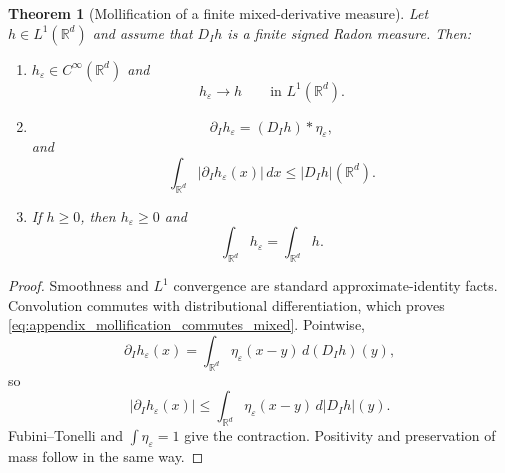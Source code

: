 \documentclass[11pt,letterpaper]{article}
\newtheorem{theorem}{Theorem}[section]
\theoremstyle{definition}
\theoremstyle{remark}
\begin{document}
\begin{theorem}[Mollification of a finite mixed-derivative measure]
\label{thm:appendix_mollification_mixed_measure}
Let $h\in L^1(\mathbb R^d)$ and assume that $D_Ih$ is a finite signed Radon
measure. Then:

\begin{enumerate}
\item[\emph{(i)}]
$h_\varepsilon\in C^\infty(\mathbb R^d)$ and
$$
h_\varepsilon\to h
\qquad
\text{in }L^1(\mathbb R^d).
$$

\item[\emph{(ii)}]
\begin{equation}
\label{eq:appendix_mollification_commutes_mixed}
\partial_Ih_\varepsilon=(D_Ih)*\eta_\varepsilon,
\end{equation}
and
\begin{equation}
\label{eq:appendix_mollification_mixed_contraction}
\int_{\mathbb R^d}|\partial_Ih_\varepsilon(x)|\,dx
\le
|D_Ih|(\mathbb R^d).
\end{equation}

\item[\emph{(iii)}] If $h\ge0$, then $h_\varepsilon\ge0$ and
$$
\int_{\mathbb R^d}h_\varepsilon
=
\int_{\mathbb R^d}h.
$$
\end{enumerate}
\end{theorem}

\begin{proof}
Smoothness and $L^1$ convergence are standard approximate-identity facts.
Convolution commutes with distributional differentiation, which proves
\eqref{eq:appendix_mollification_commutes_mixed}. Pointwise,
$$
\partial_Ih_\varepsilon(x)
=
\int_{\mathbb R^d}\eta_\varepsilon(x-y)\,d(D_Ih)(y),
$$
so
$$
|\partial_Ih_\varepsilon(x)|
\le
\int_{\mathbb R^d}\eta_\varepsilon(x-y)\,d|D_Ih|(y).
$$
Fubini--Tonelli and $\int\eta_\varepsilon=1$ give the contraction. Positivity
and preservation of mass follow in the same way.
\end{proof}
\end{document}
